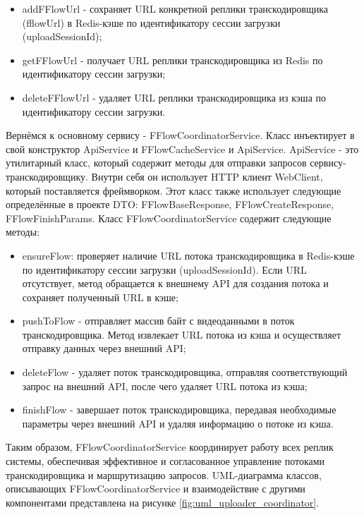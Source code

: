 	\begin{itemize}[label=$\bullet$]
		\item addFFlowUrl - сохраняет URL конкретной реплики транскодировщика (fflowUrl) в Redis-кэше по идентификатору сессии загрузки (uploadSessionId);
		\item getFFlowUrl - получает URL реплики транскодировщика из Redis по идентификатору сессии загрузки;
		\item deleteFFlowUrl - удаляет URL реплики транскодировщика из кэша по идентификатору сессии загрузки.
	\end{itemize}

	Вернёмся к основному сервису - FFlowCoordinatorService. Класс инъектирует в свой конструктор ApiService и FFlowCacheService и ApiService. ApiService - это утилитарный класс, который содержит методы для отправки запросов сервису-транскодировщику. Внутри себя он использует HTTP клиент WebClient, который поставляется фреймворком. Этот класс также использует следующие определённые в проекте DTO: FFlowBaseResponse, FFlowCreateResponse, FFlowFinishParams. Класс FFlowCoordinatorService содержит следующие методы:
	
	\begin{itemize}[label=$\bullet$]
		\item ensureFlow: проверяет наличие URL потока транскодировщика в Redis-кэше по идентификатору сессии загрузки (uploadSessionId). Если URL отсутствует, метод обращается к внешнему API для создания потока и сохраняет полученный URL в кэше;
		\item pushToFlow - отправляет массив байт с видеоданными в поток транскодировщика. Метод извлекает URL потока из кэша и осуществляет отправку данных через внешний API;
		\item deleteFlow - удаляет поток транскодировщика, отправляя соответствующий запрос на внешний API, после чего удаляет URL потока из кэша;
		\item finishFlow - завершает поток транскодировщика, передавая необходимые параметры через внешний API и удаляя информацию о потоке из кэша.
	\end{itemize}

	Таким образом, FFlowCoordinatorService координирует работу всех реплик системы, обеспечивая эффективное и согласованное управление потоками транскодировщика и маршрутизацию запросов. UML-диаграмма классов, описывающих FFlowCoordinatorService и взаимодействие с другими компонентами представлена на рисунке \ref{fig:uml_uploader_coordinator}.

